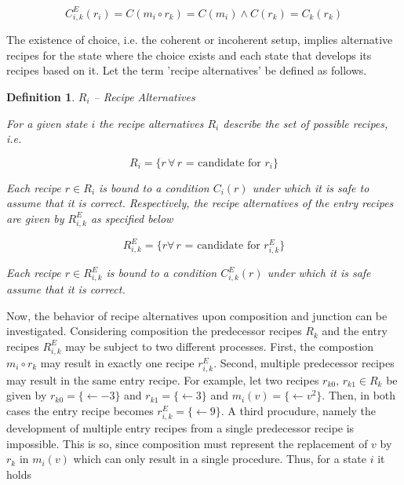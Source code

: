 \documentclass[12pt,a4paper]{scrartcl}
\newtheorem{definition}{Definition}
\begin{document}
\begin{equation} \label{eq:composition}
    C^E_{i,k}(r_i) = C(m_i \circ r_k) = C(m_i) \wedge C(r_k) = C_k(r_k)
\end{equation}

The existence of choice, i.e. the coherent or incoherent setup, implies
alternative recipes for the state where the choice exists and each state that
develops its recipes based on it. Let the term 'recipe alternatives' be defined
as follows.

\begin{definition} $R_i$ -- Recipe Alternatives

    For a given state $i$ the recipe alternatives $R_i$ describe the set of
    possible recipes, i.e.

    \begin{equation}
       R_i = \{ r \,\forall\,\mbox{$r$ = candidate for $r_i$} \}
    \end{equation}

    Each recipe $r\in R_i$ is bound to a condition $C_i(r)$ under which it is
    safe to assume that it is correct.  Respectively, the recipe alternatives
    of the entry recipes are given by $R^E_{i,k}$ as specified below

    \begin{equation}
        R^E_{i,k} = \{ r \forall\,\mbox{$r$ = candidate for $r^E_{i,k}$} \}
    \end{equation}

    Each recipe $r\in R^E_{i,k}$ is bound to a condition $C^E_{i,k}(r)$ under
    which it is safe assume that it is correct.  

\end{definition}

Now, the behavior of recipe alternatives upon composition and junction can be
investigated. Considering composition the predecessor recipes $R_k$ and the
entry recipes $R^E_{i,k}$ may be subject to two different processes. First, the
compostion $m_i \circ r_k$ may result in exactly one recipe $r^E_{i,k}$.
Second, multiple predecessor recipes may result in the same entry recipe. For
example, let two recipes $r_{k0},\,r_{k1}\in R_k$ be given by
$r_{k0}=\{\longleftarrow -3\}$ and $r_{k1}=\{ \longleftarrow 3\}$ and
$m_i(v)=\{ \longleftarrow v^2 \}$. Then, in both cases the entry recipe becomes
$r^E_{i,k}=\{ \longleftarrow 9 \}$. A third procudure, namely the development
of multiple entry recipes from a single predecessor recipe is impossible. This
is so, since composition must represent the replacement of $v$ by $r_k$ in
$m_i(v)$ which can only result in a single procedure.  Thus, for a state $i$ it
holds 
\end{document}
